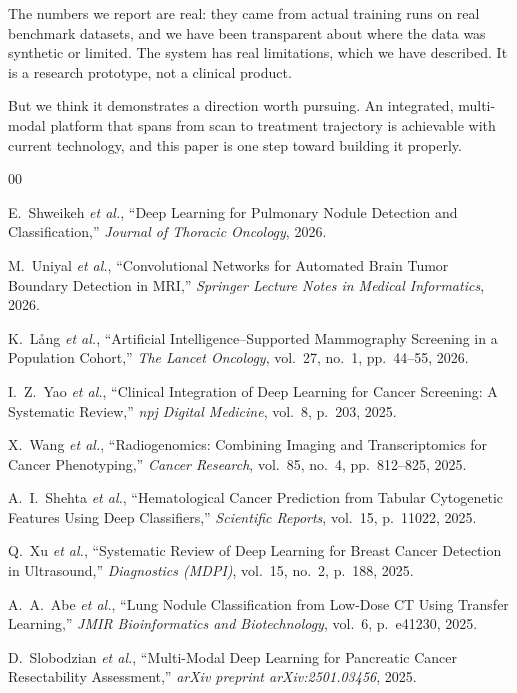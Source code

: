 \documentclass[conference]{IEEEtran}
\begin{document}
The numbers we report are real: they came from actual training runs on real benchmark datasets, and we have been transparent about where the data was synthetic or limited. The system has real limitations, which we have described. It is a research prototype, not a clinical product.

But we think it demonstrates a direction worth pursuing. An integrated, multi-modal platform that spans from scan to treatment trajectory is achievable with current technology, and this paper is one step toward building it properly.

\begin{thebibliography}{00}

E.~Shweikeh \textit{et al.}, ``Deep Learning for Pulmonary Nodule Detection and Classification,'' \textit{Journal of Thoracic Oncology}, 2026.

M.~Uniyal \textit{et al.}, ``Convolutional Networks for Automated Brain Tumor Boundary Detection in MRI,'' \textit{Springer Lecture Notes in Medical Informatics}, 2026.

K.~L{\aa}ng \textit{et al.}, ``Artificial Intelligence--Supported Mammography Screening in a Population Cohort,'' \textit{The Lancet Oncology}, vol.~27, no.~1, pp.~44--55, 2026.

I.~Z.~Yao \textit{et al.}, ``Clinical Integration of Deep Learning for Cancer Screening: A Systematic Review,'' \textit{npj Digital Medicine}, vol.~8, p.~203, 2025.

X.~Wang \textit{et al.}, ``Radiogenomics: Combining Imaging and Transcriptomics for Cancer Phenotyping,'' \textit{Cancer Research}, vol.~85, no.~4, pp.~812--825, 2025.

A.~I.~Shehta \textit{et al.}, ``Hematological Cancer Prediction from Tabular Cytogenetic Features Using Deep Classifiers,'' \textit{Scientific Reports}, vol.~15, p.~11022, 2025.

Q.~Xu \textit{et al.}, ``Systematic Review of Deep Learning for Breast Cancer Detection in Ultrasound,'' \textit{Diagnostics (MDPI)}, vol.~15, no.~2, p.~188, 2025.

A.~A.~Abe \textit{et al.}, ``Lung Nodule Classification from Low-Dose CT Using Transfer Learning,'' \textit{JMIR Bioinformatics and Biotechnology}, vol.~6, p.~e41230, 2025.

D.~Slobodzian \textit{et al.}, ``Multi-Modal Deep Learning for Pancreatic Cancer Resectability Assessment,'' \textit{arXiv preprint arXiv:2501.03456}, 2025.


\end{thebibliography}
\end{document}
